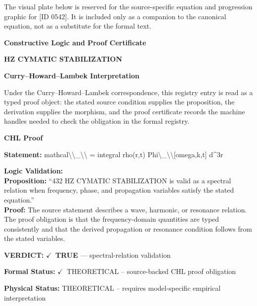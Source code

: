\begingroup\footnotesize\sloppy
The visual plate below is reserved for the source-specific equation and progression graphic for [ID 0542]. It is included only as a companion to the canonical equation, not as a substitute for the formal text.
\par\endgroup
\ifTZPDarkEdition
{}
\fi

\clearpage
\begingroup\tzpsupportsetup
\noindent\textbf{\fontsize{10.8pt}{12.8pt}\selectfont [ID 0542] Constructive Logic and Proof Certificate}\par
\noindent\textbf{\fontsize{10pt}{12pt} HZ CYMATIC STABILIZATION}\par
\vspace{0.45em}
\begingroup
\footnotesize
\setlength{\parskip}{0.22em}
\setlength{\parindent}{0pt}
\noindent\textbf{Curry--Howard--Lambek Interpretation}\par
Under the Curry--Howard--Lambek correspondence, this registry entry is read as a typed proof
object: the stated source condition supplies the proposition, the derivation supplies the
morphism, and the proof certificate records the machine handles needed to check the obligation
in the formal registry.

\vspace{0.45em}
\noindent\textbf{CHL Proof}\par
\textbf{Statement:} mathcal\textbackslash{}\textbackslash{}\_\textbackslash{}\textbackslash{} = integral rho(r,t) Phi\textbackslash{}\_\textbackslash{}\textbackslash{}[omega,k,t] d\textasciicircum{}3r

\textbf{Logic Validation:}\\
\textbf{Proposition:} ``432 HZ CYMATIC STABILIZATION is valid as a spectral relation when frequency, phase, and
propagation variables satisfy the stated equation.''\\
\textbf{Proof:} The source statement describes a wave, harmonic, or resonance relation. The proof
obligation is that the frequency-domain quantities are typed consistently and that the
derived propagation or resonance condition follows from the stated variables.

\textbf{VERDICT:} \ensuremath{\checkmark}\ \textbf{TRUE} --- spectral-relation validation

\textbf{Formal Status:} \ensuremath{\checkmark}\ THEORETICAL -- source-backed CHL proof obligation

\textbf{Physical Status:} THEORETICAL -- requires model-specific empirical interpretation
\par\vspace{0.45em}
\par
\ifTZPDarkEdition
{}
\fi
\endgroup
\endgroup

